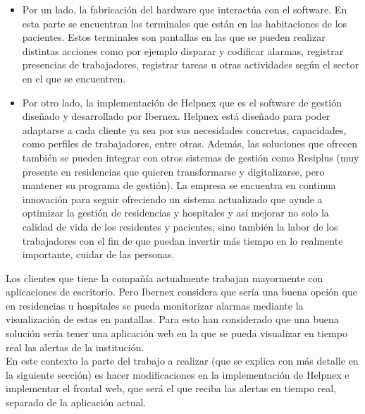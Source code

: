 \begin{itemize}
    \item Por un lado, la fabricación del hardware que interactúa con el software. En esta parte se encuentran los terminales que están en las habitaciones de los pacientes. Estos terminales son pantallas en las que se pueden realizar distintas acciones como por ejemplo disparar y codificar alarmas, registrar presencias de trabajadores, registrar tareas u otras actividades según el sector en el que se encuentren.
    \item Por otro lado, la implementación de Helpnex que es el software de gestión diseñado y desarrollado por Ibernex. Helpnex está diseñado para poder adaptarse a cada cliente ya sea por sus necesidades concretas, capacidades, como perfiles de trabajadores, entre otras.
    Además, las soluciones que ofrecen también se pueden integrar con otros sistemas de gestión como Resiplus (muy presente en residencias que quieren transformarse y digitalizarse, pero mantener su programa de gestión). 
    La empresa se encuentra en continua innovación para seguir ofreciendo un sistema actualizado que ayude a optimizar la gestión de residencias y hospitales y así mejorar no solo la calidad de vida de los residentes y pacientes, sino también la labor de los trabajadores con el fin de que puedan invertir más tiempo en lo realmente importante, cuidar de las personas.
\end{itemize}



Los clientes que tiene la compañía actualmente trabajan mayormente con aplicaciones de escritorio. Pero Ibernex considera que sería una buena opción que en residencias u hospitales se pueda monitorizar alarmas mediante la visualización de estas en pantallas. Para esto han considerado que una buena solución sería tener una aplicación web en la que se pueda visualizar en tiempo real las alertas de la institución.\\

En este contexto la parte del trabajo a realizar (que se explica con más detalle en la siguiente sección) es hacer modificaciones en la implementación de Helpnex e implementar el frontal web, que será el que reciba las alertas en tiempo real, separado de la aplicación actual.



